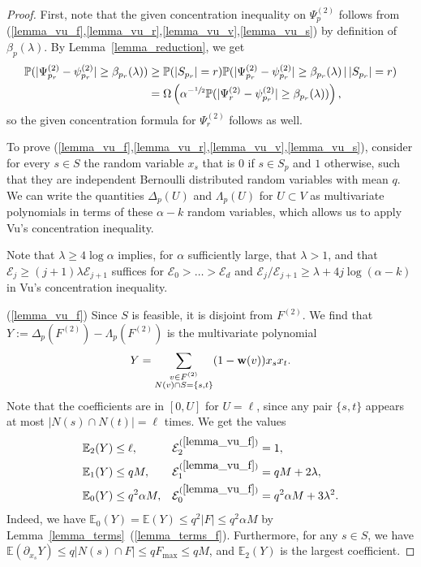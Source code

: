 \documentclass{article}
\theoremstyle{plain}
\theoremstyle{remark}
\theoremstyle{plain}
\numberwithin{equation}{section}
\renewcommand{\b}{{\bf{w}}}
\begin{document}
	\begin{proof}
		First, note that the given concentration inequality on $\Psi_p^{(2)}$ follows from (\ref{lemma_vu_f},\ref{lemma_vu_r},\ref{lemma_vu_v},\ref{lemma_vu_s}) by definition of $\beta_p(\lambda)$. By Lemma~\ref{lemma_reduction}, we get
		\begin{align}
			\mathbb{P}(|\Psi_{p_r}^{(2)}-\psi_{p_r}^{(2)}|\geq\beta_{p_r}(\lambda))&\geq\mathbb{P}(|S_{p_r}|=r)\mathbb{P}(|\Psi_{p_r}^{(2)}-\psi_{p_r}^{(2)}|\geq\beta_{p_r}(\lambda)\,|\,|S_{p_r}|=r)
			\\&=\Omega\left(\alpha^{-\sfrac12}\mathbb{P}(|\Psi_r^{(2)}-\psi_{p_r}^{(2)}|\geq\beta_{p_r}(\lambda))\right),
		\end{align}
		so the given concentration formula for $\Psi_r^{(2)}$ follows as well.
		
		To prove (\ref{lemma_vu_f},\ref{lemma_vu_r},\ref{lemma_vu_v},\ref{lemma_vu_s}), consider for every $s\in S$ the random variable $x_s$ that is $0$ if $s\in S_p$ and $1$ otherwise, such that they are independent Bernoulli distributed random variables with mean $q$. We can write the quantities $\Delta_p(U)$ and $\Lambda_p(U)$ for $U\subset V$ as multivariate polynomials in terms of these $\alpha-k$ random variables, which allows us to apply Vu's concentration inequality.
		
		Note that $\lambda\geq4\log\alpha$ implies, for $\alpha$ sufficiently large, that $\lambda>1$, and that $\mathcal{E}_j\geq(j+1)\lambda\mathcal{E}_{j+1}$ suffices for $\mathcal{E}_0>\ldots>\mathcal{E}_d$ and $\mathcal{E}_j/\mathcal{E}_{j+1}\geq\lambda+4j\log(\alpha-k)$ in Vu's concentration inequality.
		
		(\ref{lemma_vu_f}) Since $S$ is feasible, it is disjoint from $F^{(2)}$. We find that $Y:=\Delta_p(F^{(2)})-\Lambda_p(F^{(2)})$ is the multivariate polynomial $$Y=\sum_{\substack{v\in F^{(2)}\\N(v)\cap S=\{s,t\}}}(1-\b(v))x_sx_t.$$ Note that the coefficients are in $[0,U]$ for $U=\ell$, since any pair $\{s,t\}$ appears at most $|N(s)\cap N(t)|=\ell$ times. We get the values
		\begin{align}
			\mathbb{E}_2(Y)&\leq\ell,&\mathcal{E}_2^{(\ref{lemma_vu_f})}&=1,
			\\\mathbb{E}_1(Y)&\leq qM,&\mathcal{E}_1^{(\ref{lemma_vu_f})}&=qM+2\lambda,
			\\\mathbb{E}_0(Y)&\leq q^2\alpha M,&\mathcal{E}_0^{(\ref{lemma_vu_f})}&=q^2\alpha M+3\lambda^2.
		\end{align}
		Indeed, we have $\mathbb{E}_0(Y)=\mathbb{E}(Y)\leq q^2|F|\leq q^2\alpha M$ by Lemma~\ref{lemma_terms}~(\ref{lemma_terms_f}). Furthermore, for any $s\in S$, we have $\mathbb{E}(\partial_{x_s}Y)\leq q|N(s)\cap F|\leq qF_{\max}\leq qM$, and $\mathbb{E}_2(Y)$ is the largest coefficient.
		

\end{proof}
\end{document}
